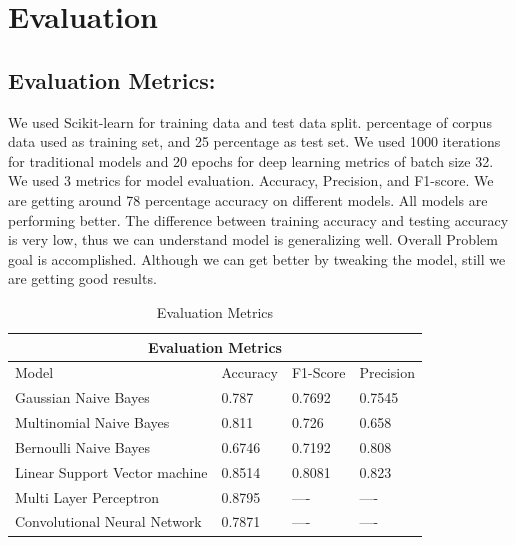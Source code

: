 \documentclass[conference]{IEEEtran}
\begin{document}
\vspace{2mm}
\section{Evaluation}
\vspace{1mm}
\subsection{Evaluation Metrics:}
\justify

We used Scikit-learn for training data and test data split.
 percentage of corpus data used as training set, and 25 percentage as test set.
We used 1000 iterations for traditional models and 20 epochs for deep learning metrics of batch size 32.
We used 3 metrics for model evaluation.
Accuracy, Precision, and F1-score.
We are getting around 78 percentage accuracy on different models. All models are performing better.
The difference between training accuracy and testing accuracy is very low, thus we can understand model is generalizing well.
Overall Problem goal is accomplished. Although we can get better by tweaking the model, still we are getting good results.


\newpage
\begin{table}[t]
\centering
\begin{tabular}{ |p{4cm}||p{4cm}|p{4cm}|p{4cm}|  }
 \hline
 \multicolumn{4}{|c|}{Evaluation Metrics} \\
 \hline
 Model & Accuracy  & F1-Score & Precision\\
 \hline
 Gaussian Naive Bayes &       0.787              &  0.7692  & 0.7545         \\
 \hline
 Multinomial Naive Bayes & 0.811 & 0.726  & 0.658          \\
 \hline
 Bernoulli Naive Bayes &       0.6746             & 0.7192   &   0.808       \\
 \hline
 Linear Support Vector machine &      0.8514              & 0.8081   &     0.823       \\
 \hline
 Multi Layer Perceptron &      0.8795         & ---- & ---- \\
 \hline
 Convolutional Neural Network & 0.7871 &  ----  & ---- \\
 \hline
\end{tabular}
\vspace{1mm}
\caption{Evaluation Metrics}
\label{table:2}
\end{table}
\end{document}
